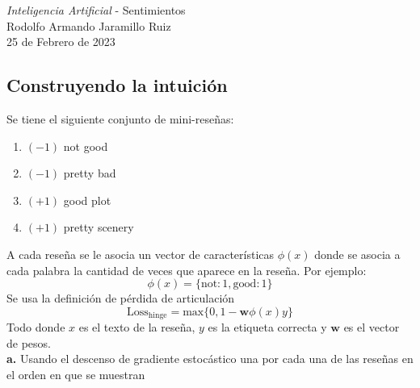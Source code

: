 \documentclass[14pt,a4paper]{report}
\begin{document}
\newcommand{\commentedbox}[2]{%
  \mbox{
    \begin{tabular}[t]{@{}c@{}}
    $\boxed{\displaystyle#1}$\\
    #2
    \end{tabular}%
  }%
}
\pagestyle{fancy}
\Large{\textit{Inteligencia Artificial} - Sentimientos}\\
\normalsize
Rodolfo Armando Jaramillo Ruiz\\
25 de Febrero de 2023\\
\subsection*{Construyendo la intuición}
\quad Se tiene el siguiente conjunto de mini-reseñas:
\begin{enumerate}
	\item $(-1)$ not good
	\item $(-1)$ pretty bad
	\item $(+1)$ good plot
	\item $(+1)$ pretty scenery
\end{enumerate}
A cada reseña se le asocia un vector de características $\phi(x)$ donde se asocia a cada palabra la cantidad de veces que aparece en la reseña. Por ejemplo:\\
\begin{equation*}
	\phi(x)=\{\text{not}:1,\text{good}:1\}
\end{equation*} 
Se usa la definición de pérdida de articulación
\begin{equation*}
	\text{Loss}_{\text{hinge}}=\text{max}\{0,1-\bm{w}\phi(x)y\}
\end{equation*}
Todo donde $x$ es el texto de la reseña, $y$ es la etiqueta correcta y $\bm{w}$ es el vector de pesos.\\
\textbf{a.} Usando el descenso de gradiente estocástico una por cada una de las reseñas en el orden en que se muestran
\end{document}
